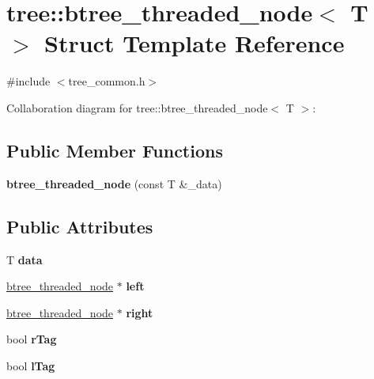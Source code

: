 \hypertarget{structtree_1_1btree__threaded__node}{\section{tree\-:\-:btree\-\_\-threaded\-\_\-node$<$ T $>$ Struct Template Reference}
\label{structtree_1_1btree__threaded__node}
}


{\ttfamily \#include $<$tree\-\_\-common.\-h$>$}



Collaboration diagram for tree\-:\-:btree\-\_\-threaded\-\_\-node$<$ T $>$\-:
\subsection*{Public Member Functions}
\begin{DoxyCompactItemize}
\item 
\hypertarget{structtree_1_1btree__threaded__node_a2752127b5320f35b87cd1e347db586f5}{{\bfseries btree\-\_\-threaded\-\_\-node} (const T \&\-\_\-data)}\label{structtree_1_1btree__threaded__node_a2752127b5320f35b87cd1e347db586f5}

\end{DoxyCompactItemize}
\subsection*{Public Attributes}
\begin{DoxyCompactItemize}
\item 
\hypertarget{structtree_1_1btree__threaded__node_a4eedf9c4f0d905ca2163d37ddcb855be}{T {\bfseries data}}\label{structtree_1_1btree__threaded__node_a4eedf9c4f0d905ca2163d37ddcb855be}

\item 
\hypertarget{structtree_1_1btree__threaded__node_ae2f6a8e3479fc61c5cd635a649a2b0f0}{\hyperlink{structtree_1_1btree__threaded__node}{btree\-\_\-threaded\-\_\-node} $\ast$ {\bfseries left}}\label{structtree_1_1btree__threaded__node_ae2f6a8e3479fc61c5cd635a649a2b0f0}

\item 
\hypertarget{structtree_1_1btree__threaded__node_ad2ffcfc42ad38e941223e32995013b21}{\hyperlink{structtree_1_1btree__threaded__node}{btree\-\_\-threaded\-\_\-node} $\ast$ {\bfseries right}}\label{structtree_1_1btree__threaded__node_ad2ffcfc42ad38e941223e32995013b21}

\item 
\hypertarget{structtree_1_1btree__threaded__node_a06b2ebcf5e85dd9feb184872af4a6e30}{bool {\bfseries r\-Tag}}\label{structtree_1_1btree__threaded__node_a06b2ebcf5e85dd9feb184872af4a6e30}

\item 
\hypertarget{structtree_1_1btree__threaded__node_a1179a89253389e3c964653739394fbbd}{bool {\bfseries l\-Tag}}\label{structtree_1_1btree__threaded__node_a1179a89253389e3c964653739394fbbd}

\end{DoxyCompactItemize}


